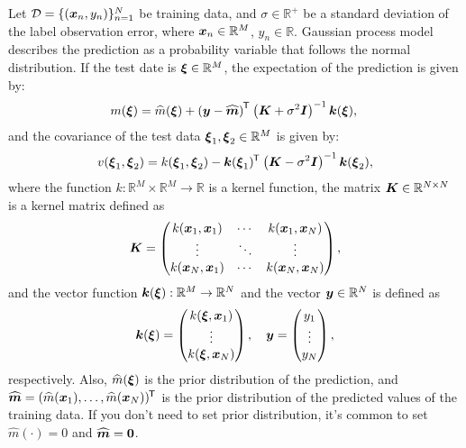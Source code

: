 \documentclass[twocolumn,a4paper,10pt]{article}
\begin{document}
Let $\mathcal{D} = \{(\boldsymbol{x}_n, y_n)\}_{n=1}^{N}$ be training data, and $\sigma \in \mathbb{R}^{+}$
be a standard deviation of the label observation error, where $\boldsymbol{x}_n \in \mathbb{R}^M$, $y_n \in \mathbb{R}$.
Gaussian process model describes the prediction as a probability variable that follows the normal distribution.
If the test date is $\boldsymbol{\xi} \in \mathbb{R}^M$, the expectation of the prediction is given by:
\begin{equation}
    m (\boldsymbol{\xi}) = \widehat{m} (\boldsymbol{\xi}) + \left( \boldsymbol{y} - \widehat{\boldsymbol{m}} \right)^{\mkern-1.5mu\mathsf{T}}\hspace{0.5pt}
    \left (\boldsymbol{K} + \sigma^2 \boldsymbol{I} \right)^{-1} \boldsymbol{k} (\boldsymbol{\xi}),
    \label{eqn:gp_exp} \\
\end{equation}
and the covariance of the test data $\boldsymbol{\xi}_1, \boldsymbol{\xi}_2 \in \mathbb{R}^M$ is given by:
\begin{equation}
    v (\boldsymbol{\xi}_1, \boldsymbol{\xi}_2) = k (\boldsymbol{\xi}_1, \boldsymbol{\xi}_2)
    - \boldsymbol{k} (\boldsymbol{\xi}_1)^{\mkern-1.5mu\mathsf{T}}\hspace{0.5pt} \left( \boldsymbol{K} - \sigma^2 \boldsymbol{I} \right)^{-1} \boldsymbol{k} (\boldsymbol{\xi}_2),
    \label{eqn:gp_cov}
\end{equation}
where the function $k: \mathbb{R}^M \times \mathbb{R}^M \to \mathbb{R}$ is a kernel function,
the matrix $\boldsymbol{K} \in \mathbb{R}^{N \times N}$ is a kernel matrix defined as
\begin {equation}
    \boldsymbol{K} = \begin{pmatrix}
        k (\boldsymbol{x}_1, \boldsymbol{x}_1) & \cdots & k (\boldsymbol{x}_1, \boldsymbol{x}_N) \\
        \vdots & \ddots & \vdots \\
        k (\boldsymbol{x}_N, \boldsymbol{x}_1) & \cdots & k (\boldsymbol{x}_N, \boldsymbol{x}_N) \\
    \end{pmatrix},
    \label{eqn:def_kernel_matrix}
\end{equation}
and the vector function $\boldsymbol{k} (\boldsymbol{\xi}): \mathbb{R}^M \to \mathbb{R}^N$ and
the vector $\boldsymbol{y} \in \mathbb{R}^N$ is defined as
\begin{equation}
    \boldsymbol{k} (\boldsymbol{\xi}) = \begin{pmatrix}
        k (\boldsymbol{\xi}, \boldsymbol{x}_1) \\
        \vdots \\
        k (\boldsymbol{\xi}, \boldsymbol{x}_N) \\
    \end{pmatrix},
    \hspace{10pt}
    \boldsymbol{y} = \begin{pmatrix}
        y_1 \\ \vdots \\ y_N \\
    \end{pmatrix},
\end{equation}
respectively.
Also, $\widehat{m} (\boldsymbol{\xi})$ is the prior distribution of the prediction, and
$\widehat{\boldsymbol{m}} = (\widehat{m} (\boldsymbol{x}_1), \ldots, \widehat{m} (\boldsymbol{x}_N))^{\mkern-1.5mu\mathsf{T}}\hspace{0.5pt}$ is
the prior distribution of the predicted values of the training data. If you don't need to set
prior distribution, it's common to set $\widehat{m} (\cdot) = 0$ and $\widehat{\boldsymbol{m}} = \boldsymbol{0}$.
\end{document}
